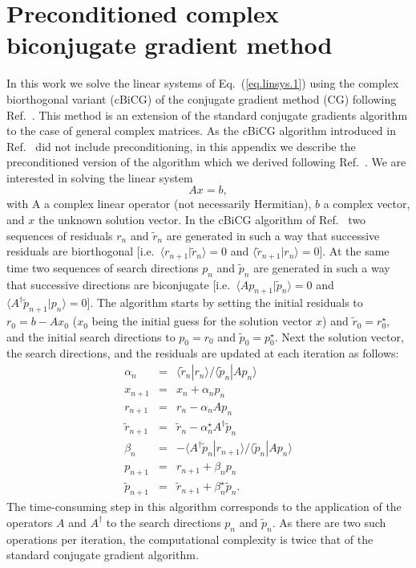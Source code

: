\documentclass[twocolumn,prb,showpacs,superscriptaddress]{revtex4}
\def\>{\rangle}
\def\<{\langle}
\def\rt{\tilde{r}}
\def\pt{\tilde{p}}
\begin{document}
\appendix

\section{Preconditioned complex biconjugate gradient method}\label{app.cbcg}

In this work we solve the linear systems of Eq.\ (\ref{eq.linsys.1}) 
using the complex biorthogonal variant (cBiCG) of the conjugate gradient method (CG)
following Ref.\ . This method is an extension of the standard
conjugate gradients algorithm to the
case of general complex matrices.
As the cBiCG algorithm introduced in Ref.\  
did not include preconditioning, in this appendix we describe 
the preconditioned version of the algorithm which we derived 
following Ref.~.
%
We are interested in solving the linear system
  \begin{equation}\label{eq.axeqb}
  Ax=b,
  \end{equation}
with A a complex linear operator (not necessarily Hermitian), $b$ a complex 
vector, and $x$ the unknown solution vector.
In the cBiCG algorithm of Ref.\  two sequences of residuals $r_n$ and
$\rt_n$ are generated in such a way that successive residuals 
are biorthogonal [i.e.\ $\<r_{n+1}|\rt_n\>=0$ and $\<\rt_{n+1}|r_n\>=0$].
At the same time two sequences of search directions 
$p_n$ and $\pt_n$ are generated in such a way that successive directions
are biconjugate [i.e.\ $\< A p_{n+1}|\pt_n \> =0$ and 
$\< A^\dagger \pt_{n+1}|p_n \> =0$].
The algorithm starts by setting the initial residuals to
$r_0 = b-Ax_0$ ($x_0$ being the initial guess for the solution vector $x$) 
and $\rt_0=r_0^\star$, and the initial search directions to $p_0=r_0$ 
and $\pt_0=p_0^\star$. Next the solution
vector, the search directions, and the residuals are updated at each
iteration as follows:
  \begin{eqnarray}
  \alpha_n & = & \<\rt_n|r_n\>/\<\pt_n|Ap_n\> \label{eq.cg1}  \\ 
  x_{n+1} & = & x_n + \alpha_n p_n \label{eq.cg2} \\ 
  r_{n+1} & = & r_n - \alpha_n Ap_n \label{eq.cg3} \\ 
  \rt_{n+1} & = & \rt_n - \alpha_n^\star A^\dagger \pt_n \label{eq.cg4}\\ 
  \beta_n & = & - \<A^\dagger\pt_n|r_{n+1}\>/\<\pt_n|Ap_n\> \label{eq.cg5}\\ 
  p_{n+1} & = & r_{n+1} + \beta_n p_n \label{eq.cg6}\\ 
  \pt_{n+1} & = & \rt_{n+1} + \beta_n^\star \label{eq.cg7} \pt_n. 
  \end{eqnarray}
The time-consuming step in this algorithm corresponds to the application of the operators
$A$ and $A^\dagger$ to the search directions $p_n$ and $\pt_n$. 
As there are two such operations per iteration, the computational complexity 
is twice that of the standard conjugate gradient algorithm.
\end{document}
